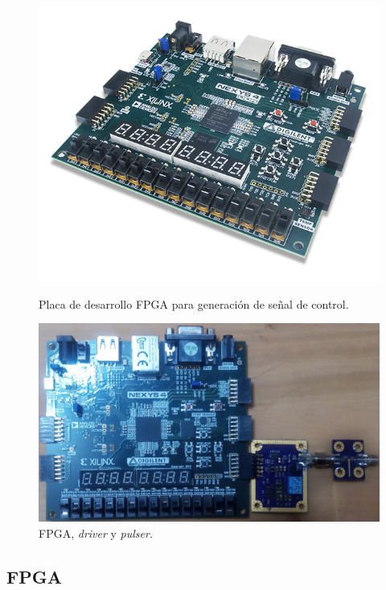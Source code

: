 \begin{figure}[t!]
    \begin{minipage}[t]{0.5\linewidth}
      \centering
        \includegraphics[width=1\textwidth]{images/mediciones_fpga.png}
        \caption{Placa de desarrollo FPGA para generación de señal de control.}
        \label{fig:mediciones_fpga}
    \end{minipage}
    \begin{minipage}[t]{0.5\linewidth}
        \centering
        \includegraphics[width=1\textwidth]{images/sistema_medido_small.jpg}
        \caption{FPGA, \textit{driver} y \textit{pulser}.}
        \label{fig:sistema_medido}
    \end{minipage}
\end{figure}

\subsection{FPGA}

